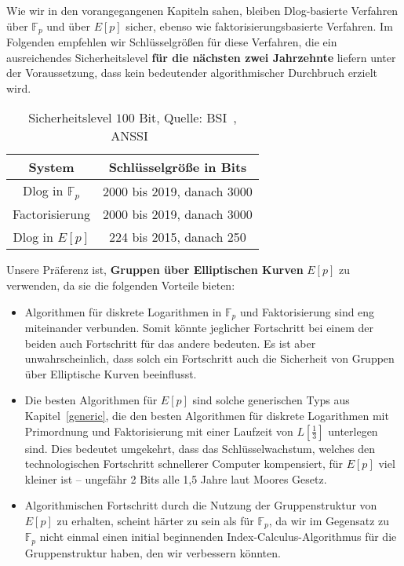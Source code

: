 \begin{refsegment}
Wie wir in den vorangegangenen Kapiteln sahen, bleiben Dlog-basierte Verfahren über $\mathbb{F}_p$ und über $E[p]$ sicher, ebenso wie faktorisierungsbasierte Verfahren. Im Folgenden empfehlen wir Schlüsselgrößen für diese Verfahren, die ein ausreichendes Sicherheitslevel {\bf für die nächsten zwei Jahrzehnte} liefern unter der Voraussetzung, dass kein bedeutender algorithmischer Durchbruch erzielt wird.
%
\begin{table}[h]
\begin{center}
\begin{tabular}{c|c}
System & Schlüsselgröße in Bits\\
\hline
Dlog in $\mathbb{F}_p$ & 2000 bis 2019, danach 3000\\
Factorisierung & 2000 bis 2019, danach 3000\\
Dlog in $E[p]$ & 224 bis 2015, danach 250\\
\end{tabular}
\caption{Sicherheitslevel $100$ Bit, Quelle: BSI~\cite{BSI2012}, ANSSI~\cite{refanssi2013}}
\end{center}
\end{table}


Unsere Präferenz ist, {\bf Gruppen über Elliptischen Kurven} $E[p]$ zu verwenden, da sie die folgenden Vorteile bieten:
\begin{itemize}
\item Algorithmen für diskrete Logarithmen in $\mathbb{F}_p$ und Faktorisierung sind eng miteinander verbunden. Somit könnte jeglicher Fortschritt bei einem der beiden auch Fortschritt für das andere bedeuten. Es ist aber unwahrscheinlich, dass solch ein Fortschritt auch die Sicherheit von Gruppen über Elliptische Kurven beeinflusst.
\item Die besten Algorithmen für $E[p]$ sind solche generischen Typs aus Kapitel~\ref{generic}, die den besten Algorithmen für diskrete Logarithmen mit Primordnung und Faktorisierung mit einer Laufzeit von $L[\frac 1 3]$ unterlegen sind. Dies bedeutet umgekehrt, dass das Schlüsselwachstum, welches den technologischen Fortschritt schnellerer Computer kompensiert, für $E[p]$ viel kleiner ist -- ungefähr 2 Bits alle 1,5 Jahre laut Moores Gesetz.
\item Algorithmischen Fortschritt durch die Nutzung der Gruppenstruktur von $E[p]$ zu erhalten, scheint härter zu sein als für $\mathbb{F}_p$, da wir im Gegensatz zu $\mathbb{F}_p$ nicht einmal einen initial beginnenden Index-Calculus-Algorithmus für die Gruppenstruktur haben, den wir verbessern könnten.


\end{itemize}
\end{refsegment}
